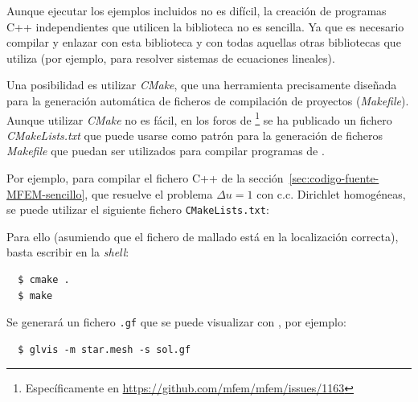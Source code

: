 Aunque ejecutar los ejemplos incluidos no es difícil, la creación de
programas C++ independientes que utilicen la biblioteca \mfem no es
sencilla. Ya que es necesario compilar y enlazar con esta biblioteca y
con todas aquellas otras bibliotecas que \mfem utiliza (por ejemplo,
para resolver sistemas de ecuaciones lineales).

Una posibilidad es utilizar \textit{CMake}, que una herramienta
precisamente diseñada para la generación automática de ficheros de
compilación de proyectos (\textit{Makefile}). Aunque utilizar
\textit{CMake} no es fácil, en los foros de
\mfem\footnote{Específicamente en
  \url{https://github.com/mfem/mfem/issues/1163}} se ha publicado un
fichero \textit{CMakeLists.txt} que puede usarse como patrón para la
generación de ficheros \textit{Makefile} que puedan ser utilizados
para compilar programas de \mfem.

Por ejemplo, para compilar el fichero C++ de la
sección~\ref{sec:codigo-fuente-MFEM-sencillo}, que resuelve el
problema $\Delta u=1$ con c.c. Dirichlet homogéneas, se puede utilizar
el siguiente fichero \texttt{CMakeLists.txt}:


Para ello (asumiendo que el fichero de mallado está en la localización
correcta), basta escribir en la \textit{shell}:
\begin{lstlisting}
  $ cmake .
  $ make
\end{lstlisting}
Se generará un fichero \texttt{.gf} que se puede visualizar con
\glvis, por ejemplo:
\begin{lstlisting}
  $ glvis -m star.mesh -s sol.gf
\end{lstlisting} %

